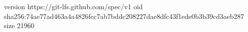 version https://git-lfs.github.com/spec/v1
oid sha256:74ae77ad463a4a4826fcc7ab7bddc208227dae8dfc43f1ede0b3b39cd3aeb287
size 21960
